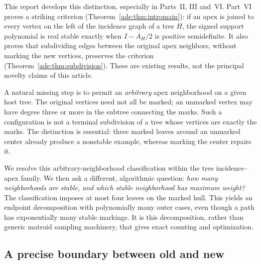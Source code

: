 \documentclass[11pt]{article}
\numberwithin{equation}{section}
\theoremstyle{definition}
\begin{document}
This report develops this distinction, especially in Parts~II, III
and~VI. Part~VI proves a striking criterion
(Theorem~\ref{ade:thm:intromain}):
if an apex is joined to every vertex on the left of the incidence graph
of a tree $H$, the signed support polynomial is real stable exactly when
$I-A_H/2$ is positive semidefinite. It also proves that subdividing edges
between the original apex neighbors, without marking the new vertices,
preserves the criterion (Theorem~\ref{ade:thm:subdivision}). These are
existing results, not the principal novelty claims of this article.

A natural missing step is to permit an \emph{arbitrary} apex neighborhood
on a given host tree. The original vertices need not all be marked; an
unmarked vertex may have degree three or more in the subtree connecting the
marks. Such a configuration is not a terminal subdivision of a tree whose
vertices are exactly the marks. The distinction is essential: three marked
leaves around an unmarked center already produce a nonstable example,
whereas marking the center repairs it.

We resolve this arbitrary-neighborhood classification within the tree
incidence--apex family. We then ask a different, algorithmic question:
\emph{how many neighborhoods are stable, and which stable neighborhood has
maximum weight?} The classification imposes at most four leaves on the
marked hull. This yields an endpoint decomposition with polynomially many
outer cases, even though a path has exponentially many stable markings.
It is this decomposition, rather than generic matroid sampling machinery,
that gives exact counting and optimization.

\subsection{A precise boundary between old and new}
\end{document}
